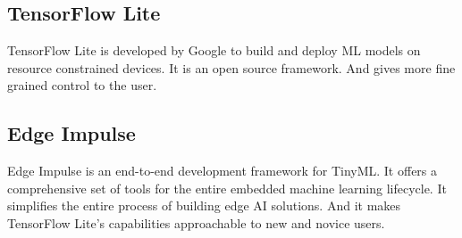 \documentclass[../../main]{subfiles}
\begin{document}
\subsection{TensorFlow Lite}

TensorFlow Lite is developed by Google to build and deploy ML models on
resource constrained devices. It is an open source framework. And gives
more fine grained control to the user.


\subsection{Edge Impulse}

Edge Impulse is an end-to-end development framework for TinyML. It
offers a comprehensive set of tools for the entire embedded machine learning
lifecycle. It simplifies the entire process of building edge AI solutions.
And it makes TensorFlow Lite's capabilities approachable to new and novice
users.

\end{document}
